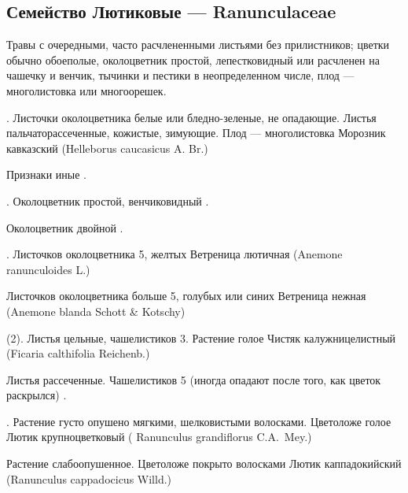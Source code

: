﻿\documentclass{article}
\begin{document}
\subsection{Семейство Лютиковые --- Ranunculaceae\label{Ran}}

Травы с очередными, часто расчлененными листьями без
прилистников; цветки обычно обоеполые, околоцветник простой,
лепестковидный или расчленен на чашечку и венчик, тычинки и
пестики в неопределенном числе, плод --- многолистовка или
многоорешек.

. Листочки околоцветника белые или бледно-зеленые, не
опадающие. Листья пальчаторассеченные, кожистые, зимующие. Плод
--- многолистовка \TT Морозник кавказский (\NN Helleborus
caucasicus A. Br.)

\AN Признаки иные .

. Околоцветник простой, венчиковидный .

\AN Околоцветник двойной .

\newpage

. Листочков околоцветника 5, желтых \TT
Ветреница лютичная (\NN Anemone ranunculoides
L.)

\AN Листочков околоцветника больше 5, голубых или синих \TT
Вет\-ре\-ни\-ца нежная (\NN Anemone blanda Schott \& Kotschy)

(2). Листья цельные, чашелистиков 3. Растение голое \TT
Чистяк калужницелистный (\NN Ficaria calthifolia
Reichenb.)

\AN Листья рассеченные. Чашелистиков 5 (иногда опадают после
того, как цветок раскрылся) .

. Растение густо опушено мягкими, шелковистыми волосками.
Цветоложе голое \TT Лютик крупноцветковый (\NN
Ranunculus grandiflorus C.A.~Mey.)

\AN Растение слабоопушенное. Цветоложе покрыто волосками \TT
Лютик каппадокийский (\NN Ranunculus cappadocicus Willd.)

\printindex
\end{document}

